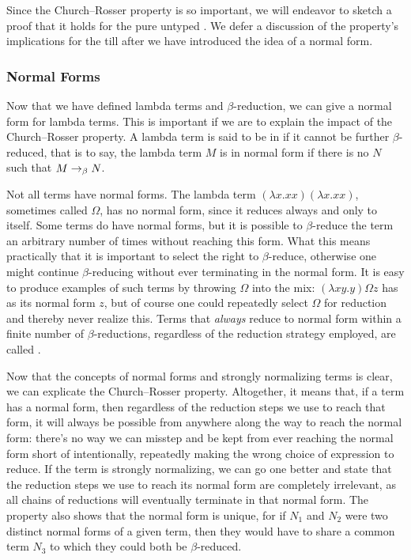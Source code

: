 Since the Church--Rosser property is so important, we will endeavor to sketch a proof that it holds for the pure untyped \lambdacalc{}. We defer a discussion of the property's implications for the \lambdacalc till after we have introduced the idea of a normal form.%

\subsubsection{Normal Forms}\label{untyped:nf}
Now that we have defined lambda terms and $\beta$-re\-duc\-tion, we can give a normal form for lambda terms. This is important if we are to explain the impact of the Church--Rosser property. A lambda term is said to be in  if it cannot be further $\beta$-reduced, that is to say, the lambda term $M$ is in normal form if there is no $N$ such that $M \betared N$.

Not all terms have normal forms. The lambda term $(\lambda x.xx)(\lambda x.xx)$, sometimes called $\Omega$, has no normal form, since it reduces always and only to itself. Some terms do have normal forms, but it is possible to $\beta$-reduce the term an arbitrary number of times without reaching this form. What this means practically that it is important to select the right  to $\beta$-reduce, otherwise one might continue $\beta$-reducing without ever terminating in the normal form. It is easy to produce examples of such terms by throwing $\Omega$ into the mix: $(\lambda xy.y) \Omega z$ has as its normal form $z$, but of course one could repeatedly select $\Omega$ for reduction and thereby never realize this. Terms that \emph{always} reduce to normal form within a finite number of $\beta$-re\-duc\-tions, regardless of the reduction strategy employed, are called .

Now that the concepts of normal forms and strongly normalizing terms is clear, we can explicate the Church--Rosser property. Altogether, it means that, if a term has a normal form, then regardless of the reduction steps we use to reach that form, it will always be possible from anywhere along the way to reach the normal form: there's no way we can misstep and be kept from ever reaching the normal form short of intentionally, repeatedly making the wrong choice of expression to reduce. If the term is strongly normalizing, we can go one better and state that the reduction steps we use to reach its normal form are completely irrelevant, as all chains of reductions will eventually terminate in that normal form. The property also shows that the normal form is unique, for if $N_{1}$ and $N_{2}$ were two distinct normal forms of a given term, then they would have to share a common term $N_{3}$ to which they could both be $\beta$-reduced.

